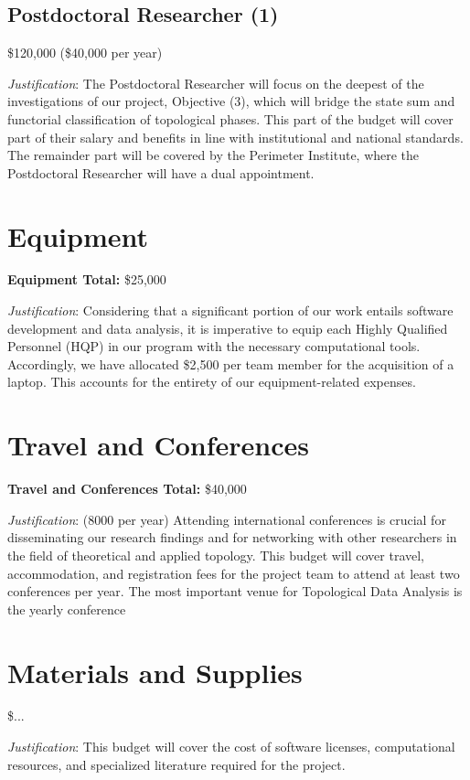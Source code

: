 \documentclass{amsart}
\begin{document}
	\subsection*{Postdoctoral Researcher (1)}
	\$120,000 (\$40,000 per year)
	\par\noindent\textit{Justification}:
	The Postdoctoral Researcher will focus on the deepest of the investigations of our project, Objective (3), which will bridge the state sum and functorial classification of topological phases. This part of the budget will cover part of their salary and benefits in line with institutional and national standards. The remainder part will be covered by the Perimeter Institute, where the Postdoctoral Researcher will have a dual appointment.

	\section*{Equipment}
	\textbf{Equipment Total:} \$25,000
	\par\noindent\textit{Justification}: Considering that a significant portion of our work entails software development and data analysis, it is imperative to equip each Highly Qualified Personnel (HQP) in our program with the necessary computational tools.
	Accordingly, we have allocated \$2,500 per team member for the acquisition of a laptop.
	This accounts for the entirety of our equipment-related expenses.

	\section*{Travel and Conferences}
	\textbf{Travel and Conferences Total:} \$40,000
	\par\noindent\textit{Justification}: (8000 per year)
	Attending international conferences is crucial for disseminating our research findings and for networking with other researchers in the field of theoretical and applied topology. This budget will cover travel, accommodation, and registration fees for the project team to attend at least two conferences per year.
	The most important venue for Topological Data Analysis is the yearly conference

	\section*{Materials and Supplies}
	\$...
	\par\noindent\textit{Justification}:
	This budget will cover the cost of software licenses, computational resources, and specialized literature required for the project.
\end{document}
